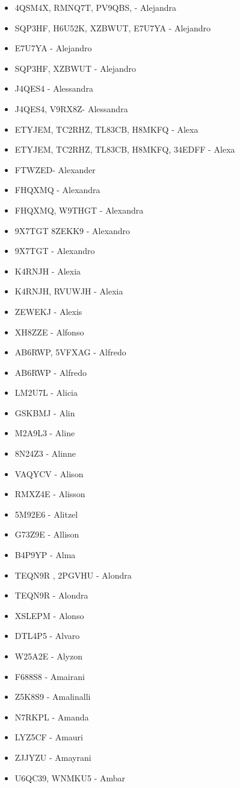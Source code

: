 \begin{itemize}[leftmargin=*,nosep]
\item 4QSM4X, RMNQ7T, PV9QBS, - Alejandra
\item SQP3HF, H6U52K, XZBWUT, E7U7YA - Alejandro
\item E7U7YA - Alejandro
\item SQP3HF, XZBWUT - Alejandro
\item J4QES4 - Alessandra
\item J4QES4, V9RX8Z- Alessandra
\item ETYJEM, TC2RHZ, TL83CB, H8MKFQ - Alexa
\item ETYJEM, TC2RHZ, TL83CB, H8MKFQ, 34EDFF - Alexa
\item FTWZED- Alexander
\item FHQXMQ - Alexandra
\item FHQXMQ, W9THGT - Alexandra
\item 9X7TGT 8ZEKK9 - Alexandro
\item 9X7TGT - Alexandro
\item K4RNJH - Alexia
\item K4RNJH, RVUWJH - Alexia
\item ZEWEKJ - Alexis
\item XH8ZZE - Alfonso
\item AB6RWP, 5VFXAG - Alfredo
\item AB6RWP - Alfredo
\item LM2U7L - Alicia
\item GSKBMJ - Alin
\item M2A9L3 - Aline
\item 8N24Z3  - Alinne
\item VAQYCV - Alison
\item RMXZ4E - Alisson
\item 5M92E6 - Alitzel
\item G73Z9E - Allison
\item B4P9YP - Alma
\item TEQN9R , 2PGVHU - Alondra
\item TEQN9R - Alondra
\item XSLEPM - Alonso
\item DTL4P5 - Alvaro
\item W25A2E - Alyzon
\item F688S8 - Amairani
\item Z5K8S9 - Amalinalli
\item N7RKPL - Amanda
\item LYZ5CF - Amauri
\item ZJJYZU - Amayrani
\item U6QC39, WNMKU5 - Ambar

\end{itemize}
